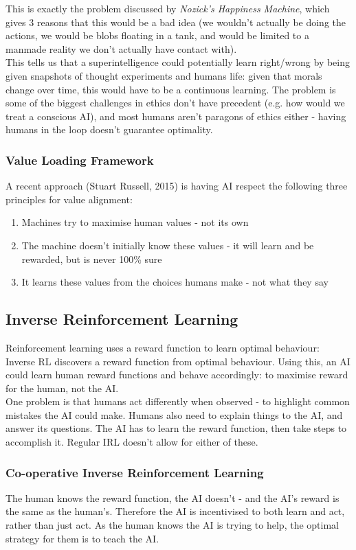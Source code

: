 This is exactly the problem discussed by \emph{Nozick's Happiness Machine}, which gives 3 reasons that this would be a bad idea (we wouldn't actually be doing the actions, we would be blobs floating in a tank, and would be limited to a manmade reality we don't actually have contact with). \\

This tells us that a superintelligence could potentially learn right/wrong by being given snapshots of thought experiments and humans life: given that morals change over time, this would have to be a continuous learning. The problem is some of the biggest challenges in ethics don't have precedent (e.g. how would we treat a conscious AI), and most humans aren't paragons of ethics either - having humans in the loop doesn't guarantee optimality. \\

\subsubsection{Value Loading Framework}
A recent approach (Stuart Russell, 2015) is having AI respect the following three principles for value alignment:
\begin{enumerate}
    \item Machines try to maximise human values - not its own
    \item The machine doesn't initially know these values - it will learn and be rewarded, but is never 100\% sure
    \item It learns these values from the choices humans make - not what they say
\end{enumerate}

\subsection{Inverse Reinforcement Learning}
Reinforcement learning uses a reward function to learn optimal behaviour: Inverse RL discovers a reward function from optimal behaviour. Using this, an AI could learn human reward functions and behave accordingly: to maximise reward for the human, not the AI.\\

One problem is that humans act differently when observed - to highlight common mistakes the AI could make. Humans also need to explain things to the AI, and answer its questions. The AI has to learn the reward function, then take steps to accomplish it. Regular IRL doesn't allow for either of these.

\subsubsection{Co-operative Inverse Reinforcement Learning}\label{subsubsec:Coop_Reinforcement_Learning}
The human knows the reward function, the AI doesn't - and the AI's reward is the same as the human's. Therefore the AI is incentivised to both learn and act, rather than just act. As the human knows the AI is trying to help, the optimal strategy for them is to teach the AI. 